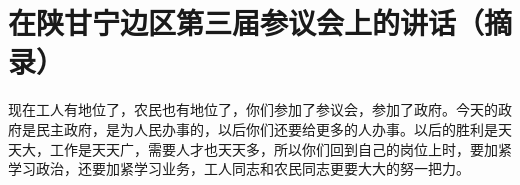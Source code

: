 \section[在陕甘宁边区第三届参议会上的讲话（摘录）（一九四一年七月一日）]{在陕甘宁边区第三届参议会上的讲话（摘录）}


现在工人有地位了，农民也有地位了，你们参加了参议会，参加了政府。今天的政府是民主政府，是为人民办事的，以后你们还要给更多的人办事。以后的胜利是天天大，工作是天天广，需要人才也天天多，所以你们回到自己的岗位上时，要加紧学习政治，还要加紧学习业务，工人同志和农民同志更要大大的努一把力。

